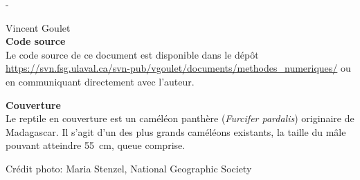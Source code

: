\begingroup
\calccentering{\unitlength}
\begin{adjustwidth*}{\unitlength}{-\unitlength}
  \setlength{\parindent}{0pt}
  \setlength{\parskip}{\baselineskip}

  {\textcopyright} {\year} Vincent Goulet \\

  

  \sloppy
  \textbf{Code source} \\
  Le code source de ce document est disponible dans le dépôt
    \url{https://svn.fsg.ulaval.ca/svn-pub/vgoulet/documents/methodes_numeriques/}
  ou en communiquant directement avec l'auteur.

  \fussy
  \textbf{Couverture} \\
  Le reptile en couverture est un caméléon panthère (\emph{Furcifer
    pardalis}) originaire de Madagascar. Il s'agit d'un des plus
  grands caméléons existants, la taille du mâle pouvant atteindre
  55~cm, queue comprise.

  Crédit photo: Maria Stenzel, National Geographic Society
\end{adjustwidth*}
\endgroup

